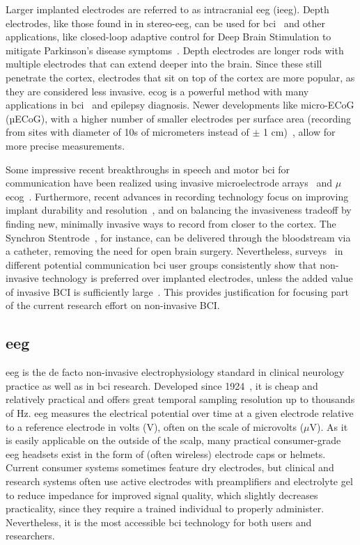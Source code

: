 Larger implanted electrodes are referred to as intracranial \ac{eeg} (i\ac{eeg}).
Depth electrodes, like those found in in stereo-\ac{eeg}, can be used for \ac{bci}~\cite{Wu2024}
 and other applications, like closed-loop adaptive control for Deep Brain Stimulation to mitigate Parkinson's disease
symptoms~\cite{Arlotti2018}.
Depth electrodes are longer rods with multiple electrodes that can extend deeper into
the brain.
Since these still penetrate the cortex, electrodes that sit on top of the cortex are
more popular, as they are considered less invasive.
\Ac{ecog} is a powerful method with many applications in \ac{bci}~\cite{Schalk2011} and
epilepsy diagnosis.
Newer developments like micro-ECoG (µECoG), with a higher
number of smaller electrodes per surface area (recording from sites with
diameter of 10s of micrometers instead of $\pm$ 1 cm)~\cite{Shokoueinejad2019},
allow for more precise measurements.

Some impressive recent breakthroughs in speech and motor \ac{bci} for communication have
been realized using invasive microelectrode arrays~\cite{Willett2021} and
$\mu$\Ac{ecog}~\cite{Metzger2023}.
Furthermore, recent advances in recording technology focus on improving implant
durability and resolution~\cite{Steinmetz2021}, and on balancing the invasiveness
tradeoff by finding new, minimally invasive ways to record from closer to the cortex.
The Synchron Stentrode~\cite{Mitchell2023}, for instance, can be delivered through the
bloodstream via a catheter, removing the need for open brain surgery.
Nevertheless, surveys~\cite{Huggins2011, Huggins2015, Branco2021} in different
potential communication \ac{bci} user groups consistently show that non-invasive
technology is preferred over implanted electrodes, unless the added value of invasive
BCI is sufficiently large~\cite{Kageyama2020}.
This provides justification for focusing part of the current research effort on
non-invasive BCI.

\subsection{\Acl{eeg}}

\Ac{eeg} is the de facto non-invasive electrophysiology standard in clinical neurology
practice as well as in \ac{bci} research.
Developed since 1924~\cite{Berger1929}, it is cheap and relatively practical and offers
great temporal sampling resolution up to thousands of Hz.
\Ac{eeg} measures the electrical potential over time at a given electrode relative to a
reference electrode in volts (V), often on the scale of microvolts ($\mu$V).
As it is easily applicable on the outside of the scalp, many practical consumer-grade
\ac{eeg} headsets exist in the form of (often wireless) electrode caps or helmets.
Current consumer systems sometimes feature dry electrodes, but clinical and research
systems often use active electrodes with preamplifiers and electrolyte gel to reduce
impedance for improved signal quality, which slightly decreases practicality, since they
require a trained individual to properly administer.
Nevertheless, it is the most accessible \ac{bci} technology for both users and
researchers.

